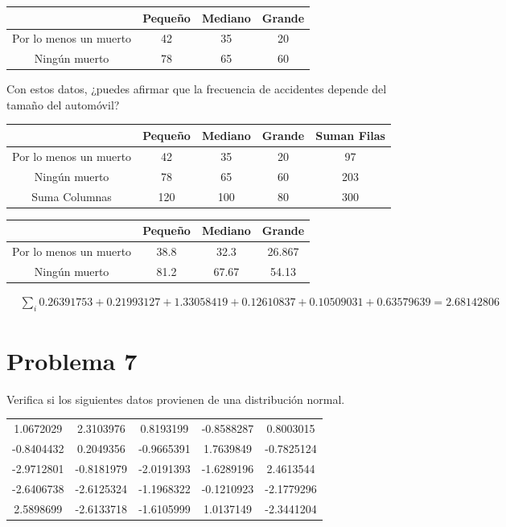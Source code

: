 \documentclass{article}
\begin{document}
\begin{center}
    \begin{tabular}{c| c c c}
                               & Pequeño & Mediano & Grande \\
        \hline
        Por lo menos un muerto & 42      & 35      & 20     \\
        Ningún muerto          & 78      & 65      & 60     \\
    \end{tabular}
\end{center}

Con estos datos,  ¿puedes afirmar que la frecuencia de accidentes depende del  tamaño del automóvil?

\begin{center}
    \begin{tabular}{c| c c c c}
                               & Pequeño & Mediano & Grande & Suman Filas \\
        \hline
        Por lo menos un muerto & 42      & 35      & 20     & 97          \\
        Ningún muerto          & 78      & 65      & 60     & 203         \\
        Suma Columnas          & 120     & 100     & 80     & 300
    \end{tabular}
\end{center}
\begin{center}
    \begin{tabular}{c| c c c}
                               & Pequeño & Mediano & Grande \\
        \hline
        Por lo menos un muerto & 38.8    & 32.3    & 26.867 \\
        Ningún muerto          & 81.2    & 67.67   & 54.13  \\
    \end{tabular}
\end{center}
\begin{align*}
     & \sum\limits_{i} 0.26391753 + 0.21993127 + 1.33058419 + 0.12610837 + 0.10509031 + 0.63579639 = 2.68142806
\end{align*}

\section{Problema 7}

Verifica si los siguientes datos provienen de una distribución normal.
\begin{center}
    \begin{tabular}{c c c c c}
        1.0672029  & 2.3103976  & 0.8193199  & -0.8588287 & 0.8003015  \\
        -0.8404432 & 0.2049356  & -0.9665391 & 1.7639849  & -0.7825124 \\
        -2.9712801 & -0.8181979 & -2.0191393 & -1.6289196 & 2.4613544  \\
        -2.6406738 & -2.6125324 & -1.1968322 & -0.1210923 & -2.1779296 \\
        2.5898699  & -2.6133718 & -1.6105999 & 1.0137149  & -2.3441204 \\
    \end{tabular}
\end{center}
\end{document}
